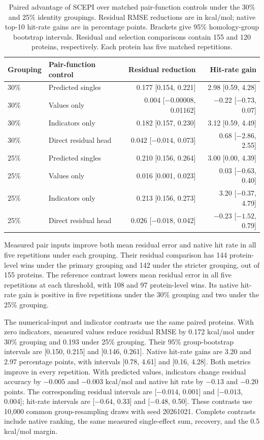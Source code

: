 \documentclass{llncs}
\begin{document}
\begin{table}[H]
\centering
\setlength{\tabcolsep}{6pt}
\caption{Paired advantage of SCEPI over matched pair-function controls under the 30\% and 25\% identity groupings. Residual RMSE reductions are in kcal/mol; native top-10 hit-rate gains are in percentage points. Brackets give 95\% homology-group bootstrap intervals. Residual and selection comparisons contain 155 and 120 proteins, respectively. Each protein has five matched repetitions.}
\label{tab:pairfunctionuncertainty}
\begin{tabular}{llrr}
\toprule
Grouping & Pair-function control & Residual reduction & Hit-rate gain \\
\midrule
30\% & Predicted singles & 0.177 [0.154, 0.221] & 2.98 [0.59, 4.28] \\
30\% & Values only & 0.004 [$-0.00008$, 0.01162] & $-0.22$ [$-0.73$, 0.07] \\
30\% & Indicators only & 0.182 [0.157, 0.230] & 3.12 [0.59, 4.49] \\
30\% & Direct residual head & 0.042 [$-0.014$, 0.073] & 0.68 [$-2.86$, 2.55] \\
25\% & Predicted singles & 0.210 [0.156, 0.264] & 3.00 [0.00, 4.39] \\
25\% & Values only & 0.016 [0.001, 0.023] & 0.03 [$-0.63$, 0.40] \\
25\% & Indicators only & 0.213 [0.156, 0.273] & 3.20 [$-0.37$, 4.79] \\
25\% & Direct residual head & 0.026 [$-0.018$, 0.042] & $-0.23$ [$-1.52$, 0.79] \\
\bottomrule
\end{tabular}
\end{table}

Measured pair inputs improve both mean residual error and native hit rate in all five repetitions under each grouping. Their residual comparison has 144 protein-level wins under the primary grouping and 142 under the stricter grouping, out of 155 proteins. The reference contrast lowers mean residual error in all five repetitions at each threshold, with 108 and 97 protein-level wins. Its native hit-rate gain is positive in five repetitions under the 30\% grouping and two under the 25\% grouping.

The numerical-input and indicator contrasts use the same paired proteins. With zero indicators, measured values reduce residual RMSE by 0.172 kcal/mol under 30\% grouping and 0.193 under 25\% grouping. Their 95\% group-bootstrap intervals are [0.150, 0.215] and [0.146, 0.261]. Native hit-rate gains are 3.20 and 2.97 percentage points, with intervals [0.78, 4.61] and [0.16, 4.28]. Both metrics improve in every repetition. With predicted values, indicators change residual accuracy by $-0.005$ and $-0.003$ kcal/mol and native hit rate by $-0.13$ and $-0.20$ points. The corresponding residual intervals are [$-0.014$, 0.001] and [$-0.013$, 0.004]; hit-rate intervals are [$-0.64$, 0.33] and [$-0.48$, 0.50]. These contrasts use 10,000 common group-resampling draws with seed 20261021. Complete contrasts include native ranking, the same measured single-effect sum, recovery, and the 0.5 kcal/mol margin.
\end{document}
